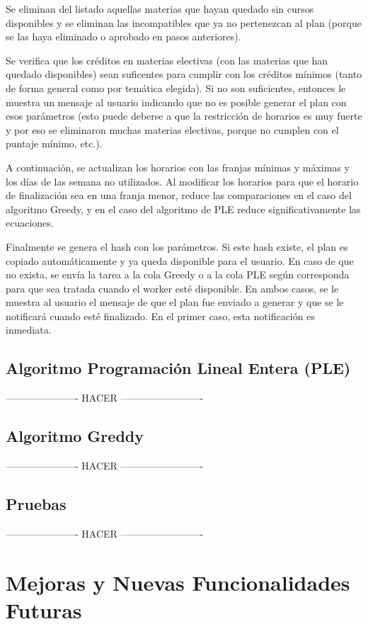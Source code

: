 \documentclass[a4paper]{article}
\begin{document}
Se eliminan del listado aquellas materias que hayan quedado sin cursos disponibles y se eliminan las incompatibles que ya no pertenezcan al plan (porque se las haya eliminado o aprobado en pasos anteriores).

Se verifica que los créditos en materias electivas (con las materias que han quedado disponibles) sean suficentes para cumplir con los créditos mínimos (tanto de forma general como por temática elegida). Si no son suficientes, entonces le muestra un mensaje al usuario indicando que no es posible generar el plan con esos parámetros (esto puede deberse a que la restricción de horarios es muy fuerte y por eso se eliminaron muchas materias electivas, porque no cumplen con el puntaje mínimo, etc.).

A continuación, se actualizan los horarios con las franjas mínimas y máximas y los días de las semana no utilizados. Al modificar los horarios para que el horario de finalización sea en una franja menor, reduce las comparaciones en el caso del algoritmo Greedy, y en el caso del algoritmo de PLE reduce significativamente las ecuaciones.

Finalmente se genera el hash con los parámetros. Si este hash existe, el plan es copiado automáticamente y ya queda disponible para el usuario. En caso de que no exista, se envía la tarea a la cola Greedy o a la cola PLE según corresponda para que sea tratada cuando el worker esté disponible. En ambos casos, se le muestra al usuario el mensaje de que el plan fue enviado a generar y que se le notificará cuando esté finalizado. En el primer caso, esta notificación es inmediata.


\subsection{Algoritmo Programación Lineal Entera (PLE)}
---------------------- HACER -------------------------


\subsection{Algoritmo Greddy}
---------------------- HACER -------------------------


\subsection{Pruebas}
---------------------- HACER -------------------------


\newpage
\section{Mejoras y Nuevas Funcionalidades Futuras}
\end{document}
